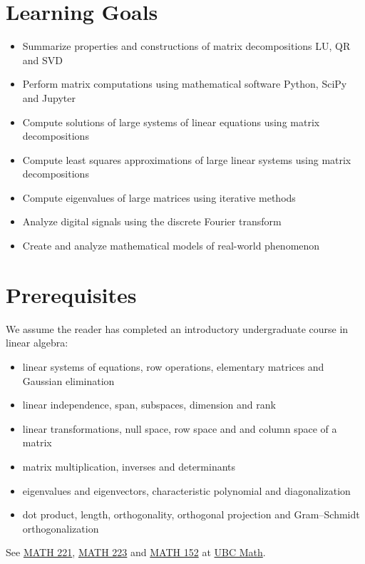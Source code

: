 \section*{Learning Goals}

\begin{itemize}[leftmargin=*]
\item Summarize properties and constructions of matrix decompositions LU, QR and SVD
\item Perform matrix computations using mathematical software Python, SciPy and Jupyter
\item Compute solutions of large systems of linear equations using matrix decompositions
\item Compute least squares approximations of large linear systems using matrix decompositions
\item Compute eigenvalues of large matrices using iterative methods
\item Analyze digital signals using the discrete Fourier transform
\item Create and analyze mathematical models of real-world phenomenon
\end{itemize}

\section*{Prerequisites}

We assume the reader has completed an introductory undergraduate course in linear algebra:
\begin{itemize}[leftmargin=*]
\item linear systems of equations, row operations, elementary matrices and Gaussian elimination
\item linear independence, span, subspaces, dimension and rank
\item linear transformations, null space, row space and and column space of a matrix
\item matrix multiplication, inverses and determinants
\item eigenvalues and eigenvectors, characteristic polynomial and diagonalization
\item dot product, length, orthogonality, orthogonal projection and Gram–Schmidt orthogonalization
\end{itemize} 
See \href{https://courses.students.ubc.ca/cs/courseschedule?pname=subjarea&tname=subj-course&dept=MATH&course=221}{MATH 221}, \href{https://courses.students.ubc.ca/cs/courseschedule?pname=subjarea&tname=subj-course&dept=MATH&course=223}{MATH 223} and \href{https://courses.students.ubc.ca/cs/courseschedule?pname=subjarea&tname=subj-course&dept=MATH&course=152}{MATH 152} at \href{https://www.math.ubc.ca}{UBC Math}.

